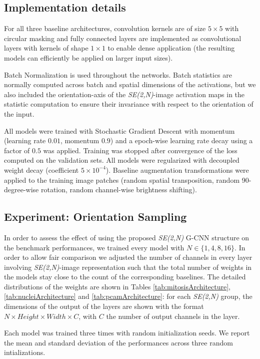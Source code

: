 \documentclass[twocolumn,final]{article}
\newcommand{\se}[1]{\textit{SE(#1)}}
\begin{document}
\subsection{Implementation details}
For all three baseline architectures, convolution kernels are of size $5 \times 5$ with circular masking and fully connected layers are implemented as convolutional layers with kernels of shape $1 \times 1$ to enable dense application (the resulting models can efficiently be applied on larger input sizes).

Batch Normalization \citep{ioffe2015batch} is used throughout the networks.
Batch statistics are normally computed across batch and spatial dimensions of the activations, but we also included the orientation-axis of the \se{2,N}-image activation maps in the statistic computation to ensure their invariance with respect to the orientation of the input.

All models were trained with Stochastic Gradient Descent with momentum (learning rate $0.01$, momentum $0.9$) and a epoch-wise learning rate decay using a factor of $0.5$ was applied.
Training was stopped after convergence of the loss computed on the validation sets.
All models were regularized with decoupled weight decay (coefficient $5 \times 10 ^{-4}$). Baseline augmentation transformations were applied to the training image patches (random spatial transposition, random 90-degree-wise rotation, random channel-wise brightness shifting).

\subsection{Experiment: Orientation Sampling}
\label{sec:expOrientation}
In order to assess the effect of using the proposed \se{2,N} G-CNN structure on the benchmark performances, we trained every model with $N \in \{1,4,8,16\}$.
In order to allow fair comparison we adjusted the number of channels in every layer involving \se{2,N}-image representation such that the total number of weights in the models stay close to the count of the corresponding baselines.
The detailed distributions of the weights are shown in Tables \ref{tab:mitosisArchitecture}, \ref{tab:nucleiArchitecture} and \ref{tab:pcamArchitecture}: for each \se{2,N} group, the dimensions of the output of the layers are shown with the format $N {\times} Height {\times} Width {\times} C$, with $C$ the number of output channels in the layer.

Each model was trained three times with random initialization seeds.
We report the mean and standard deviation of the performances across three random intializations.
\end{document}
